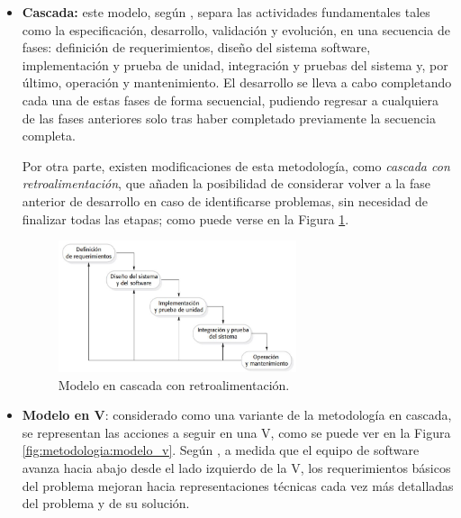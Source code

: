         \begin{itemize}
            \item \textbf{Cascada:} este modelo, según  \cite{sommerville_software_2011}, separa las actividades fundamentales tales como la especificación, desarrollo, validación y evolución, en una secuencia de fases: definición de requerimientos, diseño del sistema software, implementación y prueba de unidad, integración y pruebas del sistema y, por último, operación y mantenimiento. El desarrollo se lleva a cabo completando cada una de estas fases de forma secuencial, pudiendo regresar a cualquiera de las fases anteriores solo tras haber completado previamente la secuencia completa.
        
            Por otra parte, existen modificaciones de esta metodología, como \textit{cascada con retroalimentación}, que añaden la posibilidad de considerar volver a la fase anterior de desarrollo en caso de identificarse problemas, sin necesidad de finalizar todas las etapas; como puede verse en la Figura
            \ref{fig:metodologia:cascada_retroalimentada}.
        
            \begin{figure}[h]
                \centering
                \includegraphics[width=0.66\textwidth]{figures/cascada retroalimentada.JPG}
                \caption[Modelo en cascada con retroalimentación, extraído de \cite{sommerville_software_2011}]{Modelo en cascada con retroalimentación.}
                \label{fig:metodologia:cascada_retroalimentada}
            \end{figure}
            
            \item \textbf{Modelo en V}: considerado como una variante de la metodología en cascada, se representan las acciones a seguir en una V, como se puede ver en la Figura \ref{fig:metodologia:modelo_v}. Según \cite{pressman_software_2005}, a medida que el equipo de software avanza hacia abajo desde el lado izquierdo de la V, los requerimientos básicos del problema mejoran hacia representaciones técnicas cada vez más detalladas del problema y de su solución. 
            

\end{itemize}
